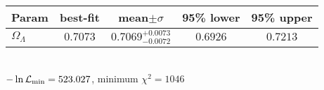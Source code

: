 \begin{tabular}{|l|c|c|c|c|} 
 \hline 
Param & best-fit & mean$\pm\sigma$ & 95\% lower & 95\% upper \\ \hline 
$\Omega_{\Lambda }$ &$0.7073$ & $0.7069_{-0.0072}^{+0.0073}$ & $0.6926$ & $0.7213$ \\ 
\hline 
 \end{tabular} \\ 
$-\ln{\cal L}_\mathrm{min} =523.027$, minimum $\chi^2=1046$ \\ 

